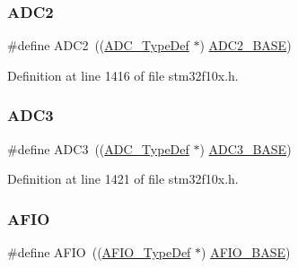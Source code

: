 \mbox{\label{group___peripheral__declaration_gac5503ae96c26b4475226f96715a1bf1e}} 
\subsubsection{\texorpdfstring{A\+D\+C2}{ADC2}}
{\footnotesize\ttfamily \#define A\+D\+C2~((\hyperlink{struct_a_d_c___type_def}{A\+D\+C\+\_\+\+Type\+Def} $\ast$) \hyperlink{group___peripheral__memory__map_ga6544abc57f9759f610eee09a02442ae6}{A\+D\+C2\+\_\+\+B\+A\+SE})}



Definition at line 1416 of file stm32f10x.\+h.

\mbox{\label{group___peripheral__declaration_gae917784606daf6b04c9b7b96b40c2f74}} 
\subsubsection{\texorpdfstring{A\+D\+C3}{ADC3}}
{\footnotesize\ttfamily \#define A\+D\+C3~((\hyperlink{struct_a_d_c___type_def}{A\+D\+C\+\_\+\+Type\+Def} $\ast$) \hyperlink{group___peripheral__memory__map_gaca766f86c8e0b00a8e2b0224dcbb4c82}{A\+D\+C3\+\_\+\+B\+A\+SE})}



Definition at line 1421 of file stm32f10x.\+h.

\mbox{\label{group___peripheral__declaration_ga582e09473429414015b1de90cf767fa8}} 
\subsubsection{\texorpdfstring{A\+F\+IO}{AFIO}}
{\footnotesize\ttfamily \#define A\+F\+IO~((\hyperlink{struct_a_f_i_o___type_def}{A\+F\+I\+O\+\_\+\+Type\+Def} $\ast$) \hyperlink{group___peripheral__memory__map_ga5f7e3eacfcf4c313c25012795148a680}{A\+F\+I\+O\+\_\+\+B\+A\+SE})}



